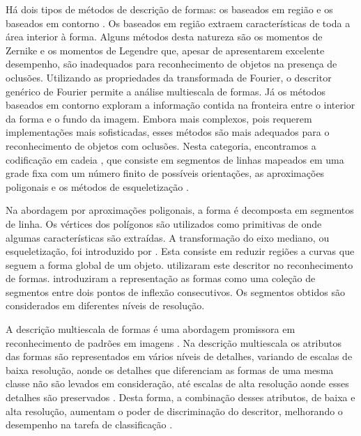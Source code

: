 Há dois tipos de métodos de descrição de formas: os baseados em região e os baseados em contorno \cite{Zhang:2004}. Os baseados em região extraem características de toda a área interior à forma. Alguns métodos desta natureza são os momentos de Zernike \cite{Kim:2000} e os momentos de Legendre \cite{Yang:2006} que, apesar de apresentarem excelente desempenho, são inadequados para reconhecimento de objetos na presença de oclusões. Utilizando as propriedades da transformada de Fourier, o descritor genérico de Fourier \cite{Zhang:2002} permite a análise multiescala de formas. Já os métodos baseados em contorno exploram a informação contida na fronteira entre o interior da forma e o fundo da imagem. Embora mais complexos, pois requerem implementações mais sofisticadas, esses métodos são mais adequados para o reconhecimento de objetos com oclusões. Nesta categoria, encontramos a codificação em cadeia \cite[p~337]{Costa:2009}, que consiste em segmentos de linhas mapeados em uma grade fixa com um número finito de possíveis orientações, as aproximações poligonais \cite[p~340--351]{Costa:2009} e os métodos de esqueletização \cite[p~394--400]{Costa:2009}. 

Na abordagem por aproximações poligonais, a forma é decomposta em segmentos de linha. Os vértices dos polígonos são utilizados como primitivas de onde algumas características são extraídas. A transformação do eixo mediano, ou esqueletização, foi introduzido por . Esta consiste em reduzir regiões a curvas que seguem a forma global de um objeto.  utilizaram este descritor no reconhecimento de formas.  introduziram a representação as formas como uma coleção de segmentos entre dois pontos de inflexão consecutivos. Os segmentos obtidos são considerados em diferentes níveis de resolução. 


A descrição multiescala de formas \cite{LiKuangLiuEtAl2016,ShuPanWu2015, HuangHanHe2014, Costa:2009} é uma abordagem promissora em reconhecimento de padrões em imagens \cite{Direkoglu:2011}. Na descrição multiescala os atributos das formas são representados em vários níveis de detalhes, variando de escalas de baixa resolução, aonde os detalhes que diferenciam as formas de uma mesma classe não são levados em consideração, até escalas de alta resolução aonde esses detalhes são preservados \cite{Ullman:1996}. Desta forma, a combinação desses atributos, de baixa e alta resolução, aumentam o poder de discriminação do descritor, melhorando o desempenho na tarefa de classificação \cite{Direkoglu:2011}.

